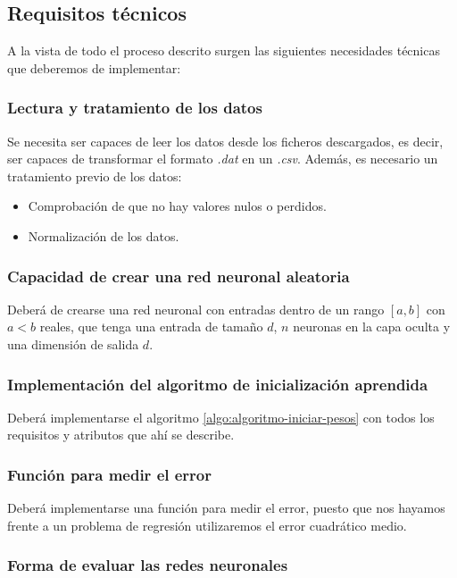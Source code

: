 \subsection{Requisitos técnicos}  

A la vista de todo el proceso descrito surgen las siguientes necesidades técnicas que deberemos de implementar:  

\subsubsection{Lectura y tratamiento de los datos}

Se necesita ser capaces de leer los datos desde los ficheros descargados, es decir, ser capaces de transformar el formato \textit{.dat} en un \textit{.csv}. 
Además, es necesario un tratamiento previo de los datos: 
\begin{itemize}
    \item Comprobación de que no hay valores nulos o perdidos. 
    \item Normalización de los datos. 
\end{itemize}


\subsubsection{Capacidad de crear una red neuronal aleatoria}  

Deberá de crearse una red neuronal con entradas dentro de un rango $[a,b]$ con $a < b$ reales,
que tenga una entrada de tamaño $d$,
$n$ neuronas en la capa oculta y
una dimensión de salida $d$.

\subsubsection{Implementación del algoritmo de inicialización aprendida}

Deberá implementarse el algoritmo  \ref{algo:algoritmo-iniciar-pesos} con todos los requisitos y atributos que ahí se describe.  

\subsubsection{Función para medir el error}

Deberá implementarse una función para medir el
 error, puesto que nos hayamos frente a un problema de regresión utilizaremos el error cuadrático medio. 

\subsubsection{Forma de evaluar las redes neuronales}  

